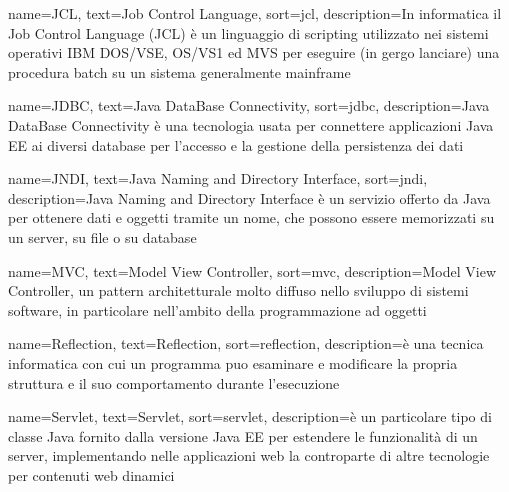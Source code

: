 {
    name=JCL,
    text=Job Control Language,
    sort=jcl,
    description={In informatica il Job Control Language (JCL) è un linguaggio di scripting utilizzato nei sistemi operativi IBM DOS/VSE, OS/VS1 ed MVS per eseguire (in gergo lanciare) una procedura batch su un sistema generalmente mainframe}
}

{
    name=JDBC,
    text=Java DataBase Connectivity,
    sort=jdbc,
    description={Java DataBase Connectivity è una tecnologia usata per connettere applicazioni Java EE ai diversi database per l'accesso e la gestione della persistenza dei dati}
}


{
    name=JNDI,
    text=Java Naming and Directory Interface,
    sort=jndi,
    description={Java Naming and Directory Interface è un servizio offerto da Java per ottenere dati e oggetti tramite un nome, che possono essere memorizzati su un server, su file o su database}
}

{
    name=MVC,
    text=Model View Controller,
    sort=mvc,
    description={Model View Controller, un pattern architetturale molto diffuso nello sviluppo di sistemi software, in particolare nell’ambito della programmazione ad oggetti}
}

{
    name=Reflection,
    text=Reflection,
    sort=reflection,
    description={è una tecnica informatica con cui un programma puo esaminare e modificare la propria struttura e il suo comportamento durante l'esecuzione}
}

{
    name=Servlet,
    text=Servlet,
    sort=servlet,
    description={è un particolare tipo di classe Java fornito dalla versione Java EE per estendere le funzionalità di un server, implementando nelle applicazioni web la controparte	di altre tecnologie per contenuti web dinamici}
}